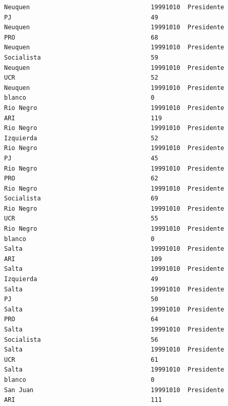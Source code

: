 \documentclass[a4paper,10pt]{article}
\begin{document}
\begin{verbatim}
Neuquen                                 19991010  Presidente                    PJ                                      49             
Neuquen                                 19991010  Presidente                    PRO                                     68             
Neuquen                                 19991010  Presidente                    Socialista                              59             
Neuquen                                 19991010  Presidente                    UCR                                     52             
Neuquen                                 19991010  Presidente                    blanco                                  0              
Rio Negro                               19991010  Presidente                    ARI                                     119            
Rio Negro                               19991010  Presidente                    Izquierda                               52             
Rio Negro                               19991010  Presidente                    PJ                                      45             
Rio Negro                               19991010  Presidente                    PRO                                     62             
Rio Negro                               19991010  Presidente                    Socialista                              69             
Rio Negro                               19991010  Presidente                    UCR                                     55             
Rio Negro                               19991010  Presidente                    blanco                                  0              
Salta                                   19991010  Presidente                    ARI                                     109            
Salta                                   19991010  Presidente                    Izquierda                               49             
Salta                                   19991010  Presidente                    PJ                                      50             
Salta                                   19991010  Presidente                    PRO                                     64             
Salta                                   19991010  Presidente                    Socialista                              56             
Salta                                   19991010  Presidente                    UCR                                     61             
Salta                                   19991010  Presidente                    blanco                                  0              
San Juan                                19991010  Presidente                    ARI                                     111            

\end{verbatim}
\end{document}
